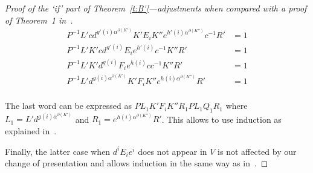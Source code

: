 \documentclass[10pt,a4paper]{article}
\theoremstyle{definition}
\theoremstyle{remark}
\newcommand{\bequal}{$\raisebox{1pt}{$\kern1.5mm
  {\scriptscriptstyle\circ}\kern-2.1mm\rule[-.4mm]{3mm}{.5pt}\kern-3mm\rule[1.2mm]{3mm}{.5pt}\kern1mm$}$}
\begin{document}
\begin{proof}[Proof of the `if' part of Theorem~\ref{t:B'}---adjustments
  when compared with a proof of Theorem~1 in~\cite{borisov69}]
\begin{align*}
  P^{-1} L' cd^{g'(i)\alpha^{\partial(K')}}K'E_i K''
  e^{h'(i)\alpha^{\partial(K'')}}c^{-1}R' &= 1 \\
  P^{-1} L' K' cd^{g'(i)}E_i e^{h'(i)} c^{-1} K''
  R' &= 1 \\
  P^{-1} L' K' d^{g(i)}F_i e^{h(i)} c c^{-1} K''
  R' &= 1 \\
  P^{-1} L' d^{g(i)\alpha^{\partial(K')}}K' F_i K'' e^{h(i)\alpha^{\partial(K'')}}  R' &= 1 \\
\end{align*}

The last word can be expressed as $PL_1K'F_iK''R_1 \bequal PL_1Q_1R_1$ where $L_1 = L'
d^{g(i)\alpha^{\partial(K')}}$ and $R_1 = e^{h(i)\alpha^{\partial(K'')}}  R'$.
This allows to use induction as explained in~\cite{borisov69}.

Finally, the latter case when $d^i E_i e^i$ does not appear in $V$ is not
affected by our change of presentation and allows induction in the same way as in~\cite{borisov69}.
\end{proof}
\end{document}
